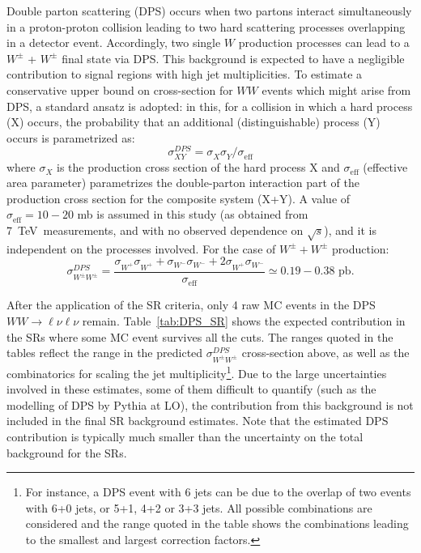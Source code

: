 Double parton scattering (DPS) occurs when two partons interact simultaneously in a proton-proton collision leading to two hard scattering 
processes overlapping in a detector event. 
Accordingly, two single $W$ production processes can lead to a $W^\pm$ + $W^\pm$ final state via DPS. 
This background is expected to have a negligible contribution to signal regions with high jet multiplicities.
To estimate a conservative upper bound on cross-section for $WW$ events which might arise from DPS, a standard ansatz is adopted: 
in this, for a collision in which a hard process (X) occurs, the probability that 
an additional (distinguishable) process (Y) occurs is parametrized as:
\begin{equation}
\sigma^{DPS}_{XY} = \sigma^{}_{X}\sigma^{}_{Y}/\sigma^{}_\text{eff}
\end{equation} 
where $\sigma^{}_{X}$ is the production cross section of the hard 
process X and $\sigma^{}_\text{eff}$ (effective area parameter) 
parametrizes the double-parton interaction part of the production 
cross section for the composite system (X+Y). 
A value of $\sigma^{}_\text{eff} = 10-20$ mb is assumed in this study (as obtained from 7~TeV~measurements, and with no observed dependence on $\sqrt{s}$), and it is independent on the processes involved. For the case of $W^\pm+W^\pm$ production:
\begin{equation}
\sigma^{DPS}_{W^\pm W^\pm} = \frac{ \sigma^{}_{W^+}\sigma^{}_{W^+} + \sigma^{}_{W^-}\sigma^{}_{W^-} + 2\sigma^{}_{W^+}\sigma^{}_{W^-}}{\sigma^{}_\text{eff} } \simeq 0.19-0.38\text{ pb.}
\end{equation} 

After the application of the SR criteria, only 4 raw MC events in the DPS $WW\to\ell\nu\ell\nu$ remain. 
Table~\ref{tab:DPS_SR} shows the expected contribution in the SRs where some MC event survives all the cuts. The ranges quoted in the tables reflect the range in the predicted $\sigma^{DPS}_{W^\pm W^\pm}$ cross-section above, as well as the combinatorics for scaling the jet multiplicity\footnote{For instance, a DPS event with 6 jets can be due to the overlap of two events with 6+0 jets, or 5+1, 4+2 or 3+3 jets. All possible combinations are considered and the range quoted in the table shows the combinations leading to the smallest and largest correction factors.}.
Due to the large uncertainties involved in these estimates, some of them difficult to quantify (such as the modelling of DPS by {\sc Pythia} at LO), the contribution from this background is not included in the final SR background estimates. 
Note that the estimated DPS contribution is typically much smaller than the uncertainty on the total background for the SRs.

